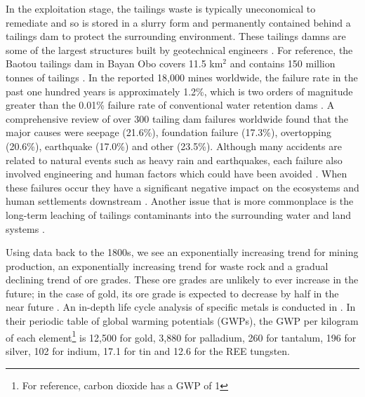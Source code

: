 \documentclass{article}
\begin{document}
In the exploitation stage, the tailings waste is typically uneconomical to remediate and so is stored in a slurry form and permanently contained behind a tailings dam to protect the surrounding environment. These tailings damns are some of the largest structures built by geotechnical engineers \cite{lyu2019comprehensive}. For reference, the Baotou tailings dam in Bayan Obo covers 11.5 km$^2$ and contains 150 million tonnes of tailings \cite{pan2016investigating}. In the reported 18,000 mines worldwide, the failure rate in the past one hundred years is approximately 1.2\%, which is two orders of magnitude greater than the 0.01\% failure rate of conventional water retention dams \cite{icold2001tailings}. A comprehensive review of over 300 tailing dam failures worldwide found that the major causes were seepage (21.6\%), foundation failure (17.3\%), overtopping (20.6\%), earthquake (17.0\%) and other (23.5\%). Although many accidents are related to natural events such as heavy rain and earthquakes, each failure also involved engineering and human factors which could have been avoided \cite{lyu2019comprehensive}. When these failures occur they have a significant negative impact  on the ecosystems and human settlements downstream \cite{hudson2003impact}. Another issue that is more commonplace is the long-term leaching of tailings contaminants into the surrounding water and land systems \cite{guo2013leaching}.

Using data back to the 1800s, we see an exponentially increasing trend for mining production, an exponentially increasing trend for waste rock and a gradual declining trend of ore grades. These ore grades are unlikely to ever increase in the future; in the case of gold, its ore grade is expected to decrease by half in the near future \cite{mudd2007sustainability}. An in-depth life cycle analysis of specific metals is conducted in \cite{nuss2014life}. In their periodic table of global warming potentials (GWPs), the GWP per kilogram of each element\footnote{For reference, carbon dioxide has a GWP of 1} is 12,500 for gold, 3,880 for palladium, 260 for tantalum, 196 for silver, 102 for indium, 17.1 for tin and 12.6 for the REE tungsten.


\end{document}
